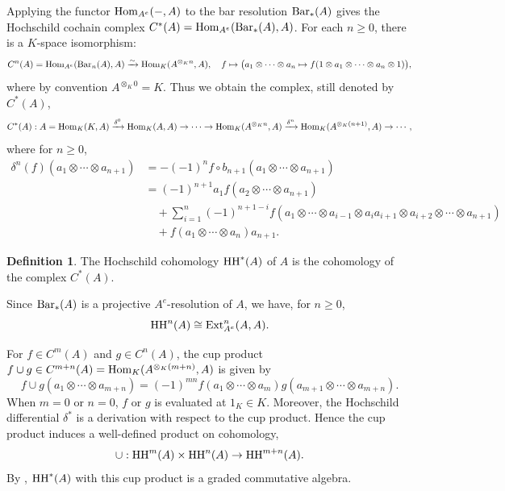 \documentclass[10pt, reqno]{amsart}
\theoremstyle{definition}
\newtheorem{definition}[theorem]{Definition}
\theoremstyle{remark}
\numberwithin{equation}{section}
\begin{document}
Applying the functor \(\mathrm{Hom}_{A^e}(-,A)\) to the bar resolution $\mathrm{Bar}_*(A)$ gives the Hochschild cochain complex \(C^*(A) = \mathrm{Hom}_{A^e}(\mathrm{Bar}_*(A), A)\). For each \(n \ge 0\), there is a \(K\)-space isomorphism:
\[
C^n(A) =\mathrm{Hom}_{A^e}(\mathrm{Bar}_n(A), A) \xrightarrow{\sim} \mathrm{Hom}_K(A^{\otimes_K n}, A), \quad f \mapsto \bigl( a_1 \otimes \cdots \otimes a_n \mapsto f(1 \otimes a_1 \otimes \cdots \otimes a_n \otimes 1) \bigr),
\]
where by convention \(A^{\otimes_K 0}=K\). Thus we obtain the complex, still denoted by $C^*(A)$, 
\[
C^*(A): A=\mathrm{Hom}_{{K}}({K}, A) \xrightarrow{\delta^0} \mathrm{Hom}_{K}(A, A) \to \cdots \to \mathrm{Hom}_{{K}}(A^{\otimes_K n}, A) \xrightarrow{\delta^{n}} \mathrm{Hom}_{K}(A^{\otimes_K {(n+1)}}, A) \to \cdots,
\]
where for \(n \ge 0\),
\[
\begin{aligned}
\delta^n(f)(a_1 \otimes \cdots \otimes a_{n+1})& =-(-1)^n f\circ b_{n+1}(a_1 \otimes \cdots \otimes a_{n+1}) \\
&=(-1)^{n+1} a_1 f(a_2 \otimes \cdots \otimes a_{n+1}) \\
&\quad + \sum_{i=1}^{n} (-1)^{n+1-i} f(a_1 \otimes \cdots \otimes a_{i-1} \otimes a_i a_{i+1} \otimes a_{i+2} \otimes \cdots \otimes a_{n+1}) \\
&\quad +  f(a_1 \otimes \cdots \otimes a_{n}) a_{n+1}.
\end{aligned}
\]
\begin{definition}
    The Hochschild cohomology \(\mathrm{HH}^*(A)\) of $A$ is the cohomology of the complex \(C^*(A)\).
\end{definition}
Since \(\mathrm{Bar}_*(A)\) is a projective \(A^e\)-resolution of \(A\), we have, for $n\ge 0$,
\[
\mathrm{HH}^n(A) \cong \operatorname{Ext}_{A^e}^{n}(A, A).
\]
 
  For \(f \in C^m(A)\) and \(g \in C^n(A)\), the cup product \(f \cup g \in C^{m+n}(A)= \mathrm{Hom}_K(A^{\otimes_K (m+n)}, A) \) is given by
\[f\cup g(a_1\otimes \cdots\otimes a_{m+n})=(-1)^{mn} f(a_1\otimes \cdots\otimes a_m) g(a_{m+1}\otimes \cdots\otimes a_{m+n}).\]
When \(m=0\) or \(n=0\), \(f\) or \(g\) is evaluated at \(1_K \in K\).  Moreover, the Hochschild differential $\delta^*$ is a derivation with respect to the cup product. Hence the cup product induces a well-defined product on cohomology,
\[
\cup: \mathrm{HH}^m(A) \times \mathrm{HH}^n(A) \to \mathrm{HH}^{m+n}(A).
\]
By \cite[Section 7, Corollary 1]{Ger63}, $\mathrm{HH}^*(A)$  with this cup product is a graded commutative algebra.
\end{document}

